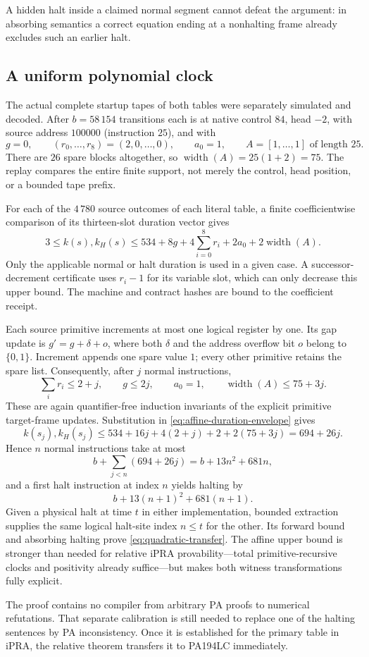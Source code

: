 A hidden halt inside a claimed normal segment cannot defeat the
argument: in absorbing semantics a correct equation ending at a
nonhalting frame already excludes such an earlier halt.

\subsection{A uniform polynomial clock}

The actual complete startup tapes of both tables were separately
simulated and decoded.  After $b=58\,154$ transitions each is at native
control $84$, head $-2$, with source address $100000$ (instruction $25$),
and with
\[
 g=0,\qquad (r_0,\ldots,r_8)=(2,0,\ldots,0),
 \qquad a_0=1,\qquad A=[1,\ldots,1]\text{ of length }25.
\]
There are $26$ spare blocks altogether, so
$\operatorname{width}(A)=25(1+2)=75$.
The replay compares the entire finite support, not merely the control,
head position, or a bounded tape prefix.

For each of the $4\,780$ source outcomes of each literal table, a finite
coefficientwise comparison of its thirteen-slot duration vector gives
\[
 3\le k(s),k_H(s)\le
 534+8g+4\sum_{i=0}^{8}r_i+2a_0+2\operatorname{width}(A).
 \tag{D}\label{eq:affine-duration-envelope}
\]
Only the applicable normal or halt duration is used in a given case.
A successor-decrement certificate uses $r_i-1$ for its variable slot,
which can only decrease this upper bound.  The machine and contract
hashes are bound to the coefficient receipt.

Each source primitive increments at most one logical register by one.
Its gap update is $g'=g+\delta+o$, where both $\delta$ and the address
overflow bit $o$ belong to $\{0,1\}$.  Increment appends one spare value
$1$; every other primitive retains the spare list.  Consequently,
after $j$ normal instructions,
\[
 \sum_i r_i\le2+j,\qquad g\le2j,\qquad
 a_0=1,\qquad \operatorname{width}(A)\le75+3j.
\]
These are again quantifier-free induction invariants of the explicit
primitive target-frame updates.  Substitution in
\eqref{eq:affine-duration-envelope} gives
\[
 k(s_j),k_H(s_j)\le
 534+16j+4(2+j)+2+2(75+3j)=694+26j.
\]
Hence $n$ normal instructions take at most
\[
 b+\sum_{j<n}(694+26j)=b+13n^2+681n,
\]
and a first halt instruction at index $n$ yields halting by
\[
 b+13(n+1)^2+681(n+1).
\]
Given a physical halt at time $t$ in either implementation, bounded
extraction supplies the same logical halt-site index $n\le t$ for the
other.  Its forward bound and absorbing halting prove
\eqref{eq:quadratic-transfer}.  The affine upper bound is stronger than
needed for relative iPRA provability---total primitive-recursive clocks
and positivity already suffice---but makes both witness transformations
fully explicit.

The proof contains no compiler from arbitrary PA proofs to numerical
refutations.  That separate calibration is still needed to replace one
of the halting sentences by PA inconsistency.  Once it is established
for the primary table in iPRA, the relative theorem transfers it to
PA194LC immediately.
